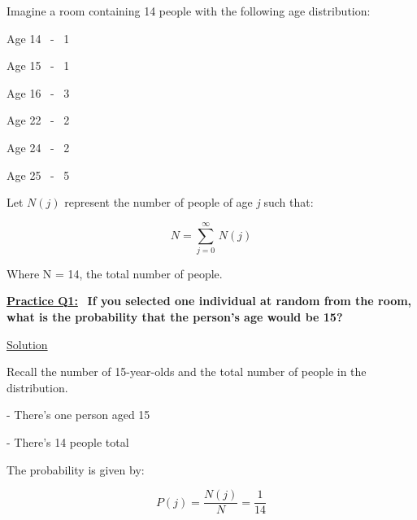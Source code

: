 Imagine a room containing 14 people with the following age distribution:

Age 14 \ - \ 1

Age 15 \ - \ 1

Age 16 \ - \ 3

Age 22 \ - \ 2

Age 24 \ - \ 2

Age 25 \ - \ 5

\bigskip

Let $N(j)$ represent the number of people of age \textit{j} such that:

\[
    N = \sum_{j=0}^{\infty} \, N(j)
\]

Where N = 14, the total number of people.

\bigskip \bigskip

\underline{\textbf{Practice Q1:}} \ \textbf{If you selected one individual at random from the room,
    what is the probability that the person's age would be 15?}

\bigskip

\underline{Solution}

Recall the number of 15-year-olds and the total number of people in the distribution.

- There's one person aged 15

- There's 14 people total

\bigskip

The probability is given by:

\[
    P(j) = \dfrac{N(j)}{N} = \boxed{\dfrac{1}{14}}
\]